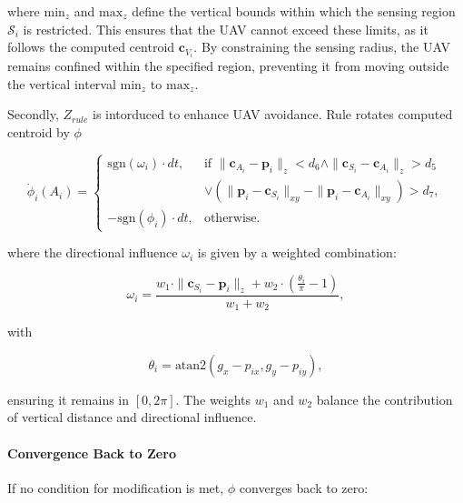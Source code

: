         where $\text{min}_z$ and $\text{max}_z$ define the vertical bounds within which the sensing region $\mathcal{S}_i$ is restricted. 
        This ensures that the \ac{UAV} cannot exceed these limits, as it follows the computed centroid \( \mathbf{c}_{V_i} \). 
        By constraining the sensing radius, the \ac{UAV} remains confined within the specified region, preventing it from moving outside the vertical interval $\text{min}_z$ to $\text{max}_z$.

        Secondly, $Z_{rule}$ is intorduced to enhance \ac{UAV} avoidance. Rule rotates computed centroid by $\phi$

        \begin{equation}
            \dot{\phi}_i(A_i) =
            \begin{cases}
                \text{sgn}(\omega_i) \cdot dt, & \text{if } \|\mathbf{c}_{A_i} - \mathbf{p}_i\|_z < d_6 \land \|\mathbf{c}_{S_i} - \mathbf{c}_{A_i}\|_z > d_5 \\ 
                                               & \lor (\|\mathbf{p}_i - \mathbf{c}_{S_i}\|_{xy} - \|\mathbf{p}_i - \mathbf{c}_{A_i}\|_{xy}) > d_7, \\
                -\text{sgn}(\phi_i) \cdot dt,  & \text{otherwise.}
            \end{cases}
        \end{equation}
        
        where the directional influence \(\omega_i\) is given by a weighted combination:
        
        \begin{equation}
            \omega_i = \frac{w_1 \cdot \|\mathbf{c}_{S_i} - \mathbf{p}_i\|_z + w_2 \cdot \left(\frac{\theta_i}{\pi} - 1\right)}{w_1 + w_2},
        \end{equation}
        
        with 
        
        \begin{equation}
            \theta_i = \text{atan2}(g_x - p_{ix}, g_y - p_{iy}),
        \end{equation}
        
        ensuring it remains in \([0, 2\pi]\). The weights \(w_1\) and \(w_2\) balance the contribution of vertical distance and directional influence.
        
        \paragraph{Convergence Back to Zero}  
        If no condition for modification is met, \(\phi\) converges back to zero:
        
